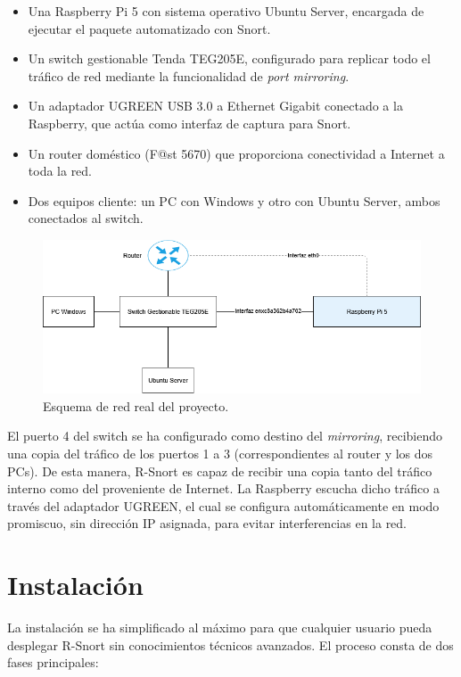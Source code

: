 \documentclass[11pt,a4paper,twoside]{report}
\begin{document}
\begin{itemize}
	\item Una Raspberry Pi 5 con sistema operativo Ubuntu Server, encargada de ejecutar el paquete automatizado con Snort.
	\item Un switch gestionable Tenda TEG205E, configurado para replicar todo el tráfico de red mediante la funcionalidad de \textit{port mirroring}.
	\item Un adaptador UGREEN USB 3.0 a Ethernet Gigabit conectado a la Raspberry, que actúa como interfaz de captura para Snort.
	\item Un router doméstico (F@st 5670) que proporciona conectividad a Internet a toda la red.
	\item Dos equipos cliente: un PC con Windows y otro con Ubuntu Server, ambos conectados al switch.
\end{itemize}

\begin{figure}[H]
	\centering
	\includegraphics[scale=0.6]{script_automatico/network.png}
	\caption{Esquema de red real del proyecto.}
\end{figure}

El puerto 4 del switch se ha configurado como destino del \textit{mirroring}, recibiendo una copia del tráfico de los puertos 1 a 3 (correspondientes al router y los dos PCs). De esta manera, R-Snort es capaz de recibir una copia tanto del tráfico interno como del proveniente de Internet. La Raspberry escucha dicho tráfico a través del adaptador UGREEN, el cual se configura automáticamente en modo promiscuo, sin dirección IP asignada, para evitar interferencias en la red.

\section{Instalación}

La instalación se ha simplificado al máximo para que cualquier usuario pueda desplegar R-Snort sin conocimientos técnicos avanzados. El proceso consta de dos fases principales:
\end{document}
